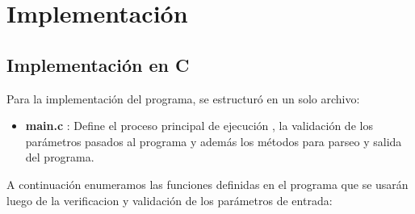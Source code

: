 \documentclass[a4paper]{article}
\begin{document}
\section{Implementación}
\subsection{Implementación en C}

Para la implementación del programa, se estructuró en un solo archivo:

\begin{itemize}
	\item \textbf{main.c} : Define el proceso principal de ejecución , la validación de los parámetros pasados al programa y además los métodos para parseo y salida del programa.
\end{itemize}
A continuación enumeramos las funciones definidas en el programa que se usarán luego de la verificacion y validación de los parámetros de entrada:
\end{document}
